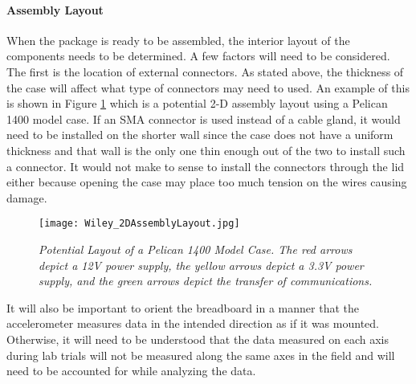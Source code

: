 \paragraph{Assembly Layout}
When the package is ready to be assembled, the interior layout of the components needs to be determined. A few factors will need to be considered. 
The first is the location of external connectors. As stated above, the thickness of the case will affect what type of connectors may need to used. 
An example of this is shown in Figure \ref{fig:Assembly} which is a potential 2-D assembly layout using a Pelican 1400 model case. If an SMA
connector is used instead of a cable gland, it would need to be installed on the shorter wall since the case does not have a uniform thickness and
that wall is the only one thin enough out of the two to install such a connector. It would not make to sense to install the connectors through
the lid either because opening the case may place too much tension on the wires causing damage. 

\begin{figure}[h]
\centering
\texttt{[image: Wiley\_2DAssemblyLayout.jpg]}
\caption{\textit{Potential Layout of a Pelican 1400 Model Case.
The red arrows depict a 12V power supply, the yellow arrows depict a 3.3V power supply, and the green arrows depict the transfer of communications.}}
\label{fig:Assembly}
\end{figure}

It will also be important to orient the breadboard in a manner that the accelerometer measures data in the intended direction as if it was mounted. 
Otherwise, it will need to be understood that the data measured on each axis during lab trials will not be measured along the same axes in the field and
will need to be accounted for while analyzing the data. 
